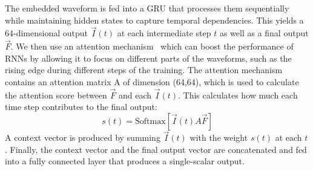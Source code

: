 The embedded waveform is fed into a GRU that processes them sequentially while maintaining hidden states to capture temporal dependencies. This yields a 64-dimensional output $\vec{I}(t)$ at each intermediate step $t$ as well as a final output $\vec{F}$. We then use an attention mechanism~\cite{attention} which can boost the performance of RNNs by allowing it to focus on different parts of the waveforms, such as the rising edge during different steps of the training. The attention mechanism contains an attention matrix A of dimension (64,64), which is used to calculate the attention score between $\vec{F}$ and each $\vec{I}(t)$. This calculates how much each time step contributes to the final output:
\begin{equation}
    s(t) = \mathrm{Softmax}[\vec{I}(t) A \vec{F}]
\end{equation}
A context vector is produced by summing $\vec{I}(t)$ with the weight $s(t)$ at each $t$. Finally, the context vector and the final output vector are concatenated and fed into a fully connected layer that produces a single-scalar output.

